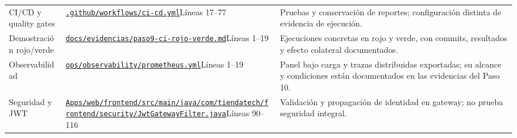 {\begin{longtable}{>{\raggedright\arraybackslash}p{2.5cm}>{\raggedright\arraybackslash}p{6.7cm}>{\raggedright\arraybackslash}p{5.2cm}}
CI/CD y quality gates & \href{https://github.com/JoseLozanoMorales/TiendaTech/blob/d7a00ccf6d8ac5def08ff52f7d2880f869667b0b/.github/workflows/ci-cd.yml\#L17-L77}{\nolinkurl{.github/workflows/ci-cd.yml}}\newline Líneas 17--77 & Pruebas y conservación de reportes; configuración distinta de evidencia de ejecución.\\
Demostración rojo/verde & \href{https://github.com/JoseLozanoMorales/TiendaTech/blob/d7a00ccf6d8ac5def08ff52f7d2880f869667b0b/docs/evidencias/paso9-ci-rojo-verde.md\#L1-L19}{\nolinkurl{docs/evidencias/paso9-ci-rojo-verde.md}}\newline Líneas 1--19 & Ejecuciones concretas en rojo y verde, con commits, resultados y efecto colateral documentados.\\
Observabilidad & \href{https://github.com/JoseLozanoMorales/TiendaTech/blob/d7a00ccf6d8ac5def08ff52f7d2880f869667b0b/ops/observability/prometheus.yml\#L1-L19}{\nolinkurl{ops/observability/prometheus.yml}}\newline Líneas 1--19 & Panel bajo carga y trazas distribuidas exportadas; su alcance y condiciones están documentados en las evidencias del Paso 10.\\
Seguridad y JWT & \href{https://github.com/JoseLozanoMorales/TiendaTech/blob/d7a00ccf6d8ac5def08ff52f7d2880f869667b0b/Apps/web/frontend/src/main/java/com/tiendatech/frontend/security/JwtGatewayFilter.java\#L90-L116}{\nolinkurl{Apps/web/frontend/src/main/java/com/tiendatech/frontend/security/JwtGatewayFilter.java}}\newline Líneas 90--116 & Validación y propagación de identidad en gateway; no prueba seguridad integral.\\
\bottomrule\end{longtable}}
